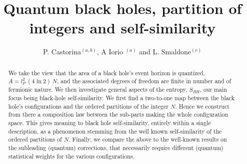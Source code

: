 \documentclass[aps,prd,showkeys,nofootinbib,superscriptaddress]{revtex4-2}
\begin{document}
\newcommand{\eg}{{\it e.g.}}
\newcommand{\etal}{{\it et. al.}}
\newcommand{\ie}{{\it i.e.}}
\newcommand{\be}{\begin{equation}}
\newcommand{\dd}{\displaystyle}
\newcommand{\ee}{\end{equation}}
\newcommand{\bea}{\begin{eqnarray}}
\newcommand{\eea}{\end{eqnarray}}
\newcommand{\bef}{\begin{figure}}
\newcommand{\eef}{\end{figure}}
\newcommand{\bce}{\begin{center}}
\newcommand{\ece}{\end{center}}
\def\lsim{\mathrel{\rlap{\lower4pt\hbox{\hskip1pt$\sim$}}
    \raise1pt\hbox{$<$}}}         %
\def\gsim{\mathrel{\rlap{\lower4pt\hbox{\hskip1pt$\sim$}}
    \raise1pt\hbox{$>$}}}         %

\title{Quantum black holes, partition of integers and self-similarity}
\author{P. Castorina$^{(a,b)}$, A Iorio $^{(a)}$ and L. Smaldone$^{(c)}$}




\begin{abstract}
We take the view that the area of a black hole's event horizon is quantized, $A = l_P^2 \, (4 \ln 2) \, N$, and the associated degrees of freedom are finite in number and of fermionic nature. We then investigate general aspects of the entropy, $S_{BH}$, our main focus being black-hole self-similarity. We first find a two-to-one map between the black hole's configurations and the ordered partitions of the integer $N$. Hence we construct from there a composition law between the sub-parts making the whole configuration space. This gives meaning to black hole self-similarity, entirely within a single description, as a phenomenon stemming from the well known self-similarity of the ordered partitions of $N$. Finally, we compare the above to the well-known results on the subleading (quantum) corrections, that necessarily require different (quantum) statistical weights for the various configurations.
\end{abstract}
\end{document}
